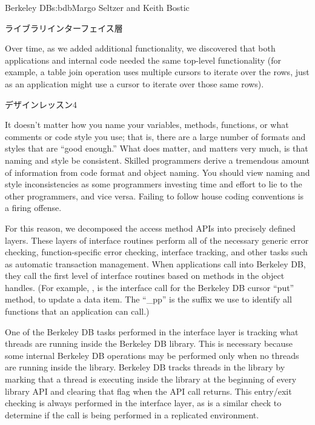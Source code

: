 \begin{aosachapter}{Berkeley DB}{s:bdb}{Margo Seltzer and Keith Bostic}
\begin{aosasect1}{ライブラリインターフェイス層}
\label{sec.bdb.int}

Over time, as we added additional functionality, we discovered that
both applications and internal code needed the same top-level
functionality (for example, a table join operation uses multiple
cursors to iterate over the rows, just as an application might use a
cursor to iterate over those same rows).

\begin{aosabox}{デザインレッスン4}

It doesn't matter how you name your variables, methods, functions, or
what comments or code style you use; that is, there are a large number
of formats and styles that are ``good enough.'' What does matter, and
matters very much, is that naming and style be consistent. Skilled
programmers derive a tremendous amount of information from code format
and object naming. You should view naming and style inconsistencies as
some programmers investing time and effort to lie to the other
programmers, and vice versa. Failing to follow house coding
conventions is a firing offense.

\end{aosabox}

For this reason, we decomposed the access method APIs into precisely
defined layers. These layers of interface routines perform all of the
necessary generic error checking, function-specific error checking,
interface tracking, and other tasks such as automatic transaction
management. When applications call into Berkeley DB, they call the
first level of interface routines based on methods in the object
handles. (For example, , is the interface call
for the Berkeley DB cursor ``put'' method, to update a data item. The
``\_pp'' is the suffix we use to identify all functions that an
application can call.) 

One of the Berkeley DB tasks performed in the interface layer is
tracking what threads are running inside the Berkeley DB library. This
is necessary because some internal Berkeley DB operations may be
performed only when no threads are running inside the
library. Berkeley DB tracks threads in the library by marking that a
thread is executing inside the library at the beginning of every
library API and clearing that flag when the API call returns. This
entry/exit checking is always performed in the interface layer, as is
a similar check to determine if the call is being performed in a
replicated environment.


\end{aosasect1}
\end{aosachapter}

